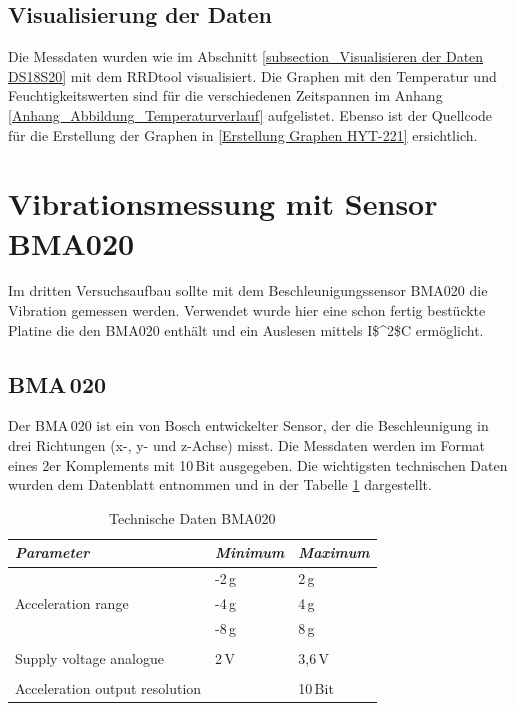 \subsection{Visualisierung der Daten}
\label{subsection_Visualisierung der Daten}
Die Messdaten wurden wie im Abschnitt \ref{subsection_Visualisieren der Daten DS18S20} mit dem RRDtool visualisiert. Die Graphen mit den Temperatur und Feuchtigkeitswerten sind für die verschiedenen Zeitspannen im Anhang \ref{Anhang_Abbildung_Temperaturverlauf} aufgelistet. Ebenso ist der Quellcode für die Erstellung der Graphen in \ref{Erstellung Graphen HYT-221}  ersichtlich.\newpage


\section{Vibrationsmessung mit Sensor BMA020}
\label{section_BMA020}
Im dritten Versuchsaufbau sollte mit dem Beschleunigungssensor BMA020 die Vibration gemessen werden. Verwendet wurde hier eine schon fertig bestückte Platine die den BMA020 enthält und ein Auslesen mittels \ac{I$^2$C} ermöglicht.

\subsection{BMA\,020}
\label{subsection_BMA020}
Der BMA\,020 ist ein von Bosch entwickelter Sensor, der die Beschleunigung in drei Richtungen (x-, y- und z-Achse) misst. Die Messdaten werden im Format eines 2er Komplements mit 10\,Bit ausgegeben. Die wichtigsten technischen Daten wurden dem Datenblatt \citep{Datenblatt_BMA020} entnommen und in der Tabelle \ref{Tabelle_Technische_Daten_BMA020} dargestellt.  

\begin{table}[H]
\centering
\begin{tabular}{
lll
}
\toprule

\multicolumn{1}{p{5.5cm}}{\textit{Parameter}} & \multicolumn{1}{p{3cm}}{\textit{Minimum} }&\multicolumn{1}{p{3cm}}{\textit{Maximum}}\\\midrule
&-2\,g & 2\,g\\
Acceleration range & -4\,g & 4\,g\\
&-8\,g & 8\,g\\
&&\\
Supply voltage analogue & 2\,V & 3,6\,V\\
&&\\
Acceleration output resolution &&10\,Bit\\
\bottomrule
\end{tabular}
\caption{Technische Daten BMA020 \citep{Datenblatt_BMA020}}
\label{Tabelle_Technische_Daten_BMA020}
\end{table}

